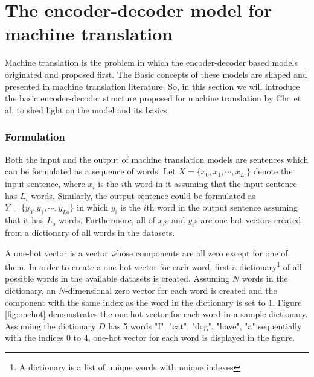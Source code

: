 \documentclass[preprint, 12pt]{elsarticle}
\begin{document}
	\section{The encoder-decoder model for machine translation}
	Machine translation is the problem in which the encoder-decoder based models originated and proposed first. The Basic concepts of these models are shaped and presented in machine translation literature. So, in this section we will introduce the basic encoder-decoder structure proposed for machine translation by Cho et al. \cite{cho2014learning} to shed light on the model and its basics.
	
		\subsubsection{Formulation}
		Both the input and the output of machine translation models are sentences which can be formulated as a sequence of words. Let $X = \{x_0, x_1, \cdots, x_{L_{i}}\}$ denote the input sentence, where $x_i$ is the $i$th word in it assuming that the input sentence has $L_{i}$ words. Similarly, the output sentence could be formulated as $Y = \{y_0, y_1, \cdots, y_{L{o}}\}$ in which $y_i$ is the $i$th word in the output sentence assuming that it has $L_{o}$ words. Furthermore, all of $x_i$s and $y_i$s are one-hot vectors created from a dictionary of all words in the datasets.
		
		A one-hot vector is a vector whose components are all zero except for one of them. In order to create a one-hot vector for each word, first a dictionary\footnote{A dictionary is a list of unique words with unique indexes} of all possible words in the available datasets is created. Assuming $N$ words in the dictionary, an $N$-dimensional zero vector for each word is created and the component with the same index as the word in the dictionary is set to 1. Figure \ref{fig:onehot} demonstrates the one-hot vector for each word in a sample dictionary. Assuming the dictionary $D$ has 5 words "I", "cat", "dog", "have", "a" sequentially with the indices 0 to 4, one-hot vector for each word is displayed in the figure.
		
\end{document}
